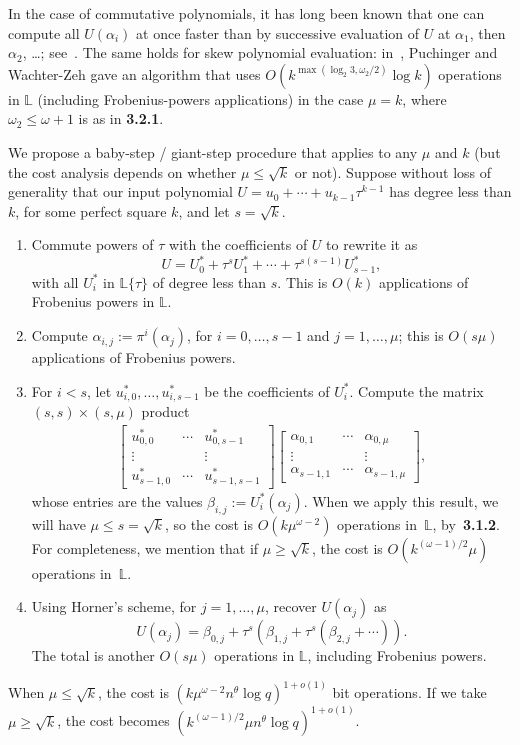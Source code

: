 \documentclass[sigconf]{acmart}
\renewcommand{\L}{\mathbb{L}}
\newcommand{\ang}[1]{\{#1\}}
\begin{document}
In the case of commutative
polynomials, it has long been known that one can compute all
$U(\alpha_i)$ at once faster than by successive evaluation of $U$ at
$\alpha_1$, then $\alpha_2$, \dots;
see~\cite[Ch.~10]{Gathen:2003:MCA:945759}. The same holds for 
skew polynomial evaluation: in~\cite[Th.~15]{PUCHINGER2017b},
Puchinger and Wachter-Zeh gave an algorithm that uses
$O(k^{\max(\log_2 3, \omega_2/2)}\log k)$ operations in $\L$
(including Frobenius-powers applications) in the case $\mu=k$, where
$\omega_2 \le \omega+1$ is as in {\bf 3.2.1}.

We propose a baby-step / giant-step procedure that applies
to any $\mu$ and $k$ (but the cost analysis depends on whether
$\mu \le \sqrt{k}$ or not). Suppose without loss of
generality that our input polynomial $U = u_0 + \cdots +
u_{k-1}\tau^{k-1}$ has degree less than $k$, for some perfect square
$k$, and let $s=\sqrt{k}$.
\begin{enumerate}
\item Commute powers of $\tau$ with the coefficients of $U$ to rewrite it as 
$$U = U^*_{0} + \tau^s U^*_{1} + \cdots + \tau^{s(s-1)} U^*_{s-1},$$
  with all $U^*_i$ in $\L\ang{\tau}$ of degree less than $s$.
This is $O(k)$  applications of Frobenius powers in $\L$.
\item Compute $\alpha_{i,j}:=\pi^i(\alpha_j)$, for
  $i=0,\dots,s-1$ and $j=1,\dots,\mu$; this is $O(s \mu)$
applications of Frobenius powers.
\item For $i< s$, let $u^*_{i,0},\dots,u^*_{i,s-1}$ be 
the coefficients of $U^*_i$. Compute the matrix 
$(s,s) \times (s,\mu)$ product
\begin{align*}
\left [ \begin{matrix}
u^*_{0,0} & \cdots & u^*_{0,s-1} \\
\vdots && \vdots \\
u^*_{s-1,0} & \cdots & u^*_{s-1,s-1} 
  \end{matrix} \right ]
\left [ \begin{matrix}
\alpha_{0,1} & \cdots & \alpha_{0,\mu} \\
\vdots && \vdots \\
\alpha_{s-1,1} & \cdots & \alpha_{s-1,\mu} 
  \end{matrix} \right ],
\end{align*}
whose entries are the values $\beta_{i,j}:=U^*_{i}(\alpha_j)$.  When
we apply this result, we will have $\mu \le s = \sqrt{k}$, so the cost is $O(k
\mu^{\omega-2})$ operations in~$\L$, by~{\bf 3.1.2}. For completeness,
we mention that if $\mu \ge \sqrt{k}$, the cost is
$O(k^{(\omega-1)/2} \mu)$  operations in~$\L$.

\item Using Horner's scheme, for $j=1,\dots,\mu$, recover $U(\alpha_j)$ as 
$$U(\alpha_j) = \beta_{0,j} + \tau^s( \beta_{1,j} + \tau^s(\beta_{2,j}
  + \cdots )).$$ The total is another $O(s \mu)$ operations
in $\L$, including Frobenius powers.
\end{enumerate}
When $\mu \le \sqrt{k}$, the cost is $(k \mu^{\omega-2}
n^\theta \log q)^{1+ o(1)}$ bit operations. If we take $\mu\ge
\sqrt{k}$, the cost  becomes $(k^{(\omega-1)/2} \mu n^\theta \log
q)^{1+ o(1)}$.
\end{document}

